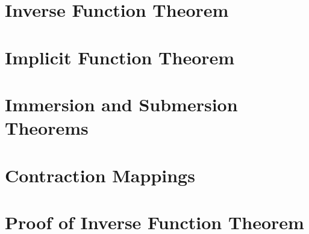 \documentclass[12pt]{article}
\begin{document}
\section{Inverse Function Theorem}



\section{Implicit Function Theorem}



\section{Immersion and Submersion Theorems}



\section{Contraction Mappings}



\section{Proof of Inverse Function Theorem}


\end{document}
